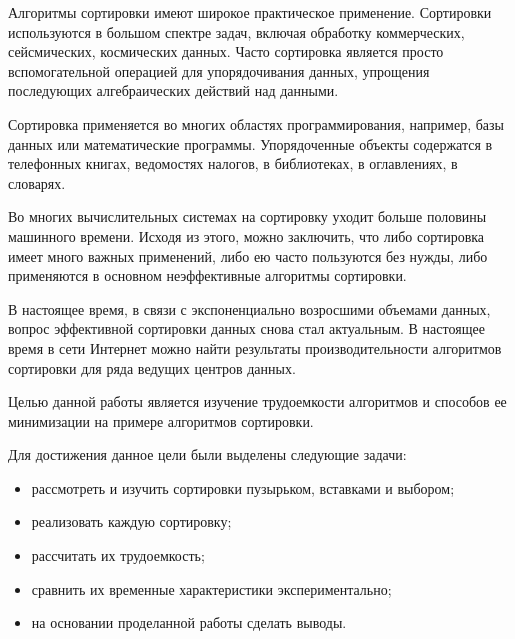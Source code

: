\Introduction

\setcounter{page}{2}

Алгоритмы сортировки имеют широкое практическое применение. Сортировки используются в большом спектре задач, включая обработку коммерческих, сейсмических, космических данных. Часто сортировка является просто вспомогательной операцией для упорядочивания данных, упрощения последующих алгебраических действий над данными.

Сортировка применяется во многих областях программирования, например, базы данных или математические программы. Упорядоченные объекты содержатся в телефонных книгах, ведомостях налогов, в библиотеках,
в оглавлениях, в словарях.

Во многих вычислительных системах на сортировку уходит больше половины машинного времени. Исходя из этого, можно заключить, что либо сортировка имеет много важных применений, либо ею часто пользуются
без нужды, либо применяются в основном неэффективные алгоритмы сортировки.

В настоящее время, в связи с экспоненциально возросшими объемами данных, вопрос эффективной сортировки данных снова стал актуальным. В настоящее время в сети Интернет можно найти результаты производительности алгоритмов сортировки для ряда ведущих центров данных. 

Целью данной работы является изучение трудоемкости алгоритмов и способов ее минимизации на примере алгоритмов сортировки.

Для достижения данное цели были выделены следующие задачи:
\begin{itemize}
\item рассмотреть и изучить сортировки пузырьком, вставками и выбором;
\item реализовать каждую сортировку;
\item рассчитать их трудоемкость;
\item сравнить их временные характеристики экспериментально;
\item на основании проделанной работы сделать выводы.
\end{itemize}


